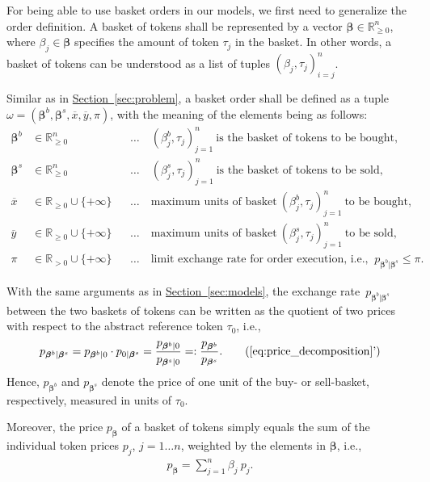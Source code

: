 \documentclass[11pt,parskip=full]{scrartcl}%
\newcommand*{\ie}{i.e., }
\newcommand*{\secref}[1]{\hyperref[{#1}]{Section~\ref*{#1}}}
\begin{document}
For being able to use basket orders in our models, we first need to generalize the order
definition.
A basket of tokens shall be represented by a vector $\bm{\beta} \in \mathbb{R}^n_{\ge 0}$, where
$\beta_j \in \bm{\beta}$ specifies the amount of token $\tau_j$ in the basket.
In other words, a basket of tokens can be understood as a list of tuples
$(\beta_j, \tau_j)_{i=j}^n$.

Similar as in \secref{sec:problem}, a basket order shall be defined as a tuple
$\omega = (\bm{\beta}^b, \bm{\beta}^s, \overline{x}, \overline{y}, \pi)$, with the meaning of the
elements being as follows:
\begin{align*}
  \bm{\beta}^b &\in \mathbb{R}^n_{\ge 0} &&
    \ldots \quad (\beta^b_j,\tau_j)_{j=1}^n \> \text{is the basket of tokens to be bought,}\\
  \bm{\beta}^s &\in \mathbb{R}^n_{\ge 0} &&
    \ldots \quad (\beta^s_j,\tau_j)_{j=1}^n \> \text{is the basket of tokens to be sold,}\\
  \overline{x} &\in \mathbb{R}_{\ge 0} \cup \{+\infty\} &&
    \ldots \quad \text{maximum units of basket} \> (\beta^b_j,\tau_j)_{j=1}^n \> \text{to be
    bought,}\\
  \overline{y} &\in \mathbb{R}_{\ge 0} \cup \{+\infty\} &&
    \ldots \quad \text{maximum units of basket} \> (\beta^s_j,\tau_j)_{j=1}^n \> \text{to be
    sold,}\\
  \pi &\in \mathbb{R}_{>0} \cup \{+\infty\} &&
    \ldots \quad \text{limit exchange rate for order execution, \ie}
    \> p_{\bm{\beta}^b|\bm{\beta}^s} \le \pi.
\end{align*}

With the same arguments as in \secref{sec:models}, the exchange rate~$p_{\bm{\beta}^b|\bm{\beta}^s}$
between the two baskets of tokens can be written as the quotient of two prices with respect to the
abstract reference token $\tau_0$, \ie
\begin{align}
  p_{\bm{\beta}^b|\bm{\beta}^s} =
  p_{\bm{\beta}^b|0} \cdot p_{0|\bm{\beta}^s} =
  \frac{p_{\bm{\beta}^b|0}}{p_{\bm{\beta}^s|0}} =:
  \frac{p_{\bm{\beta}^b}}{p_{\bm{\beta}^s}}.
  \tag{\ref{eq:price_decomposition}'}
\end{align}
Hence, $p_{\bm{\beta}^b}$ and $p_{\bm{\beta}^s}$ denote the price of one unit of the buy- or
sell-basket, respectively, measured in units of $\tau_0$.

Moreover, the price $p_{\bm{\beta}}$ of a basket of tokens simply equals the sum of the individual
token prices $p_j$, $j=1 \ldots n$, weighted by the elements in $\bm{\beta}$, \ie
\begin{align}
  p_{\bm{\beta}} = \sum\limits_{j=1}^n \beta_j \> p_j.
\end{align}
\end{document}
